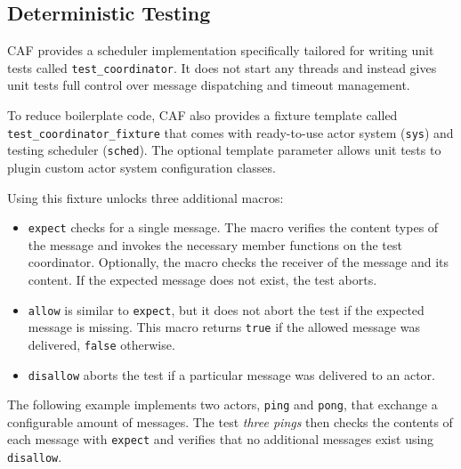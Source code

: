 \subsection{Deterministic Testing}

CAF provides a scheduler implementation specifically tailored for writing unit
tests called \lstinline^test_coordinator^. It does not start any threads and
instead gives unit tests full control over message dispatching and timeout
management.

To reduce boilerplate code, CAF also provides a fixture template called
\lstinline^test_coordinator_fixture^ that comes with ready-to-use actor system
(\lstinline^sys^) and testing scheduler (\lstinline^sched^). The optional
template parameter allows unit tests to plugin custom actor system
configuration classes.

Using this fixture unlocks three additional macros:

\begin{itemize}

  \item

    \lstinline^expect^ checks for a single message. The macro verifies the
    content types of the message and invokes the necessary member functions on
    the test coordinator. Optionally, the macro checks the receiver of the
    message and its content. If the expected message does not exist, the test
    aborts.

  \item

    \lstinline^allow^ is similar to \lstinline^expect^, but it does not abort
    the test if the expected message is missing. This macro returns
    \lstinline^true^ if the allowed message was delivered, \lstinline^false^
    otherwise.

  \item

    \lstinline^disallow^ aborts the test if a particular message was delivered
    to an actor.

\end{itemize}

The following example implements two actors, \lstinline^ping^ and
\lstinline^pong^, that exchange a configurable amount of messages. The test
\emph{three pings} then checks the contents of each message with
\lstinline^expect^ and verifies that no additional messages exist using
\lstinline^disallow^.

